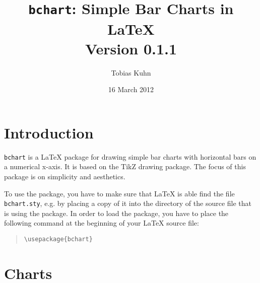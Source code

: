 \documentclass{article}
\title{
  \texttt{bchart}: Simple Bar Charts in \LaTeX
  \medskip\\
  \large Version 0.1.1
}
\author{Tobias Kuhn}
\date{16 March 2012}
\begin{document}
\maketitle


\section{Introduction}

\texttt{bchart} is a {\LaTeX} package for drawing simple bar charts with horizontal bars on a numerical x-axis. It is based on the TikZ drawing package. The focus of this package is on simplicity and aesthetics.

To use the package, you have to make sure that {\LaTeX} is able find the file \texttt{bchart.sty}, e.g. by placing a copy of it into the directory of the source file that is using the package. In order to load the package, you have to place the following command at the beginning of your {\LaTeX} source file:
\begin{quote}\small
\begin{verbatim}
\usepackage{bchart}
\end{verbatim}
\end{quote}


\section{Charts}
\end{document}
